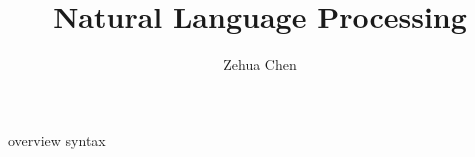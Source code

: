 \documentclass[letterpaper, 11pt]{report}
\title{Natural Language Processing}
\author{Zehua Chen}
\begin{document}
  \maketitle
  \tableofcontents

  {overview}
  {syntax}
\end{document}
